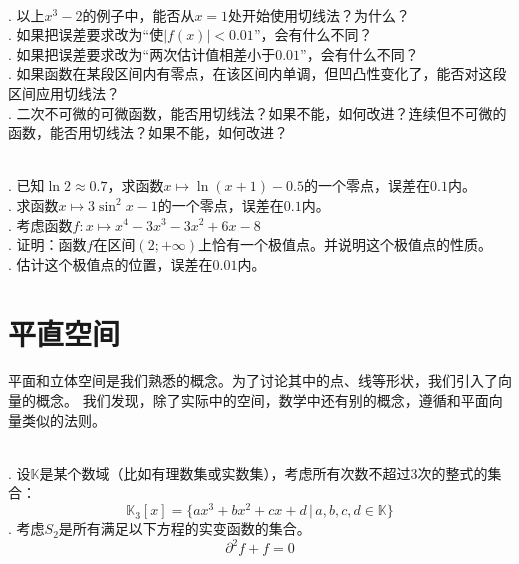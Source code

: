 \documentclass[12pt,UTF8,fontset=none]{ctexbook}
\begin{document}
\begin{sk}
    \mbox{} \\
    . 以上$x^3 - 2$的例子中，能否从$x=1$处开始使用切线法？为什么？\\
    . 如果把误差要求改为“使$|f(x)| < 0.01$”，会有什么不同？\\
    . 如果把误差要求改为“两次估计值相差小于$0.01$”，会有什么不同？\\
    . 如果函数在某段区间内有零点，在该区间内单调，但凹凸性变化了，能否对这段区间应用切线法？\\
    . 二次不可微的可微函数，能否用切线法？如果不能，如何改进？连续但不可微的函数，能否用切线法？如果不能，如何改进？
\end{sk}

\begin{xt}
    \mbox{} \\
    . 已知$\ln{2} \approx 0.7$，求函数$x\mapsto \ln{(x+1)} - 0.5$的一个零点，误差在$0.1$内。\\
    . 求函数$x\mapsto 3\sin^2{x} - 1$的一个零点，误差在$0.1$内。\\
    . 考虑函数$f:x\mapsto x^4-3 x^3-3 x^2+6 x-8$ \\
    . 证明：函数$f$在区间$(2;+\infty)$上恰有一个极值点。并说明这个极值点的性质。\\
    . 估计这个极值点的位置，误差在$0.01$内。
\end{xt}


\chapter{平直空间}
平面和立体空间是我们熟悉的概念。为了讨论其中的点、线等形状，我们引入了向量的概念。
我们发现，除了实际中的空间，数学中还有别的概念，遵循和平面向量类似的法则。

\begin{ex}
    \mbox{} \\
    . 设$\mathbb{K}$是某个数域（比如有理数集或实数集），考虑所有次数不超过$3$次的整式的集合：
    $$\mathbb{K}_3[x] = \{ax^3 + bx^2 + cx + d \, | \, a, b, c, d \in \mathbb{K}\}$$
    . 考虑$S_2$是所有满足以下方程的实变函数的集合。
    $$ \partial^2 f + f = 0$$
\end{ex}
\end{document}
